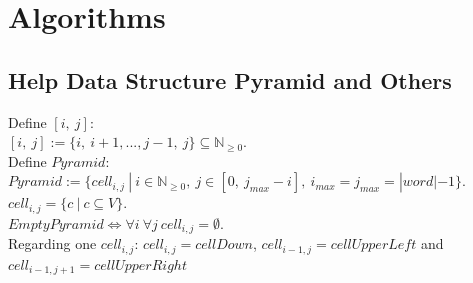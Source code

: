 
\section{Algorithms}\label{algorithms}

\subsection{Help Data Structure Pyramid and Others}

\noindent Define $[i,\ j]$: \\
$[i,\ j] := \{i,\ i+1,..., j-1,\ j\} \subseteq \mathbb{N}_{\geq 0}$.\\

\noindent Define $Pyramid$:\\
$Pyramid :=\{ cell_{i,j}\ |\ i \in \mathbb{N}_{\geq 0},\  j \in [0,\ j_{max}-i],\ i_{max} = j_{max} = |word|-1\}$.\\
$cell_{i,j} = \{c\ |\ c \subseteq V\}$.\\
$EmptyPyramid \Leftrightarrow \forall i\ \forall j\ cell_{i,j}=\emptyset$.\\
Regarding one $cell_{i,j}$: $cell_{i,j} = cellDown$, $cell_{i-1,j} = cellUpperLeft$ and $cell_{i-1,j+1} = cellUpperRight$  \\

\newcommand{\boxpyramid}[1]{
\fontsize{5}{12}\selectfont{#1}
}

